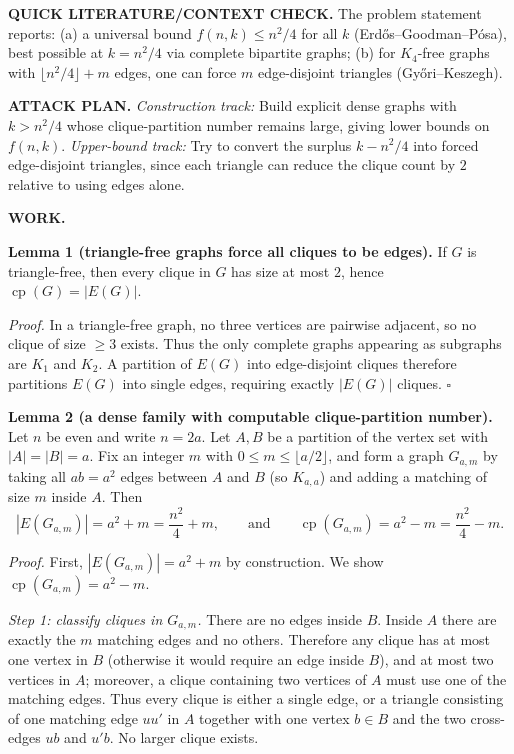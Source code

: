 \medskip
\noindent\textbf{QUICK LITERATURE/CONTEXT CHECK.}
The problem statement reports: (a) a universal bound $f(n,k)\le n^2/4$ for all $k$ (Erd\H{o}s--Goodman--P\'osa), best possible at $k=n^2/4$ via complete bipartite graphs; (b) for $K_4$-free graphs with $\lfloor n^2/4\rfloor+m$ edges, one can force $m$ edge-disjoint triangles (Gy\H{o}ri--Keszegh).

\medskip
\noindent\textbf{ATTACK PLAN.}
\emph{Construction track:} Build explicit dense graphs with $k>n^2/4$ whose clique-partition number remains large, giving lower bounds on $f(n,k)$.
\emph{Upper-bound track:} Try to convert the surplus $k-n^2/4$ into forced edge-disjoint triangles, since each triangle can reduce the clique count by $2$ relative to using edges alone.

\medskip
\noindent\textbf{WORK.}

\noindent\textbf{Lemma 1 (triangle-free graphs force all cliques to be edges).}
If $G$ is triangle-free, then every clique in $G$ has size at most $2$, hence $\operatorname{cp}(G)=|E(G)|$.

\textit{Proof.}
In a triangle-free graph, no three vertices are pairwise adjacent, so no clique of size $\ge 3$ exists.
Thus the only complete graphs appearing as subgraphs are $K_1$ and $K_2$.
A partition of $E(G)$ into edge-disjoint cliques therefore partitions $E(G)$ into single edges, requiring exactly $|E(G)|$ cliques.
\hfill$\square$

\medskip
\noindent\textbf{Lemma 2 (a dense family with computable clique-partition number).}
Let $n$ be even and write $n=2a$.
Let $A,B$ be a partition of the vertex set with $|A|=|B|=a$.
Fix an integer $m$ with $0\le m\le \lfloor a/2\rfloor$, and form a graph $G_{a,m}$ by taking all $ab=a^2$ edges between $A$ and $B$ (so $K_{a,a}$) and adding a matching of size $m$ inside $A$.
Then
\[
|E(G_{a,m})| = a^2+m = \frac{n^2}{4}+m,
\qquad\text{and}\qquad
\operatorname{cp}(G_{a,m}) = a^2-m = \frac{n^2}{4}-m.
\]

\textit{Proof.}
First, $|E(G_{a,m})|=a^2+m$ by construction.
We show $\operatorname{cp}(G_{a,m})=a^2-m$.

\emph{Step 1: classify cliques in $G_{a,m}$.}
There are no edges inside $B$.
Inside $A$ there are exactly the $m$ matching edges and no others.
Therefore any clique has at most one vertex in $B$ (otherwise it would require an edge inside $B$), and at most two vertices in $A$; moreover, a clique containing two vertices of $A$ must use one of the matching edges.
Thus every clique is either a single edge, or a triangle consisting of one matching edge $uu'$ in $A$ together with one vertex $b\in B$ and the two cross-edges $ub$ and $u'b$.
No larger clique exists.


